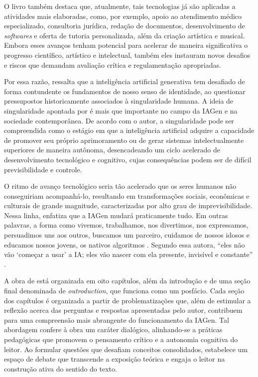 \documentclass[portuguese]{textolivre}
\begin{document}
O livro também destaca que, atualmente, tais tecnologias já são aplicadas a atividades mais elaboradas, como, por exemplo, apoio ao atendimento médico especializado, consultoria jurídica, redação de documentos, desenvolvimento de \textit{softwares} e oferta de tutoria personalizada, além da criação artística e musical. Embora esses avanços tenham potencial para acelerar de maneira significativa o progresso científico, artístico e intelectual, também eles instauram novos desafios e riscos que demandam avaliação crítica e regulamentação apropriadas.

Por essa razão, \textcite{kaplan2024generative} ressalta que a inteligência artificial generativa tem desafiado de forma contundente os fundamentos de nosso senso de identidade, ao questionar pressupostos historicamente associados à singularidade humana. A ideia de singularidade apontada por \textcite{kaplan2024generative} é mais que importante no campo da IAGen e na sociedade contemporânea. De acordo com o autor, a singularidade pode ser compreendida como o estágio em que a inteligência artificial adquire a capacidade de promover seu próprio aprimoramento ou de gerar sistemas intelectualmente superiores de maneira autônoma, desencadeando um ciclo acelerado de desenvolvimento tecnológico e cognitivo, cujas consequências podem ser de difícil previsibilidade e controle.

O ritmo de avanço tecnológico seria tão acelerado que os seres humanos não conseguiriam acompanhá-lo, resultando em transformações sociais, econômicas e culturais de grande magnitude, caracterizadas por alto grau de imprevisibilidade. Nessa linha, \textcite{kaplan2024generative} enfatiza que a IAGen mudará praticamente tudo. Em outras palavras, a forma como vivemos, trabalhamos, nos divertimos, nos expressamos, persuadimos uns aos outros, buscamos um parceiro, cuidamos de nossos idosos e educamos nossos jovens, os nativos algoritmos \cite{jorge2025iai}. Segundo essa autora, “eles não vão ‘começar a usar’ a IA; eles vão nascer com ela presente, invisível e constante” \cite[p.~189]{jorge2025iai}.

A obra de \textcite{kaplan2024generative} está organizada em oito capítulos, além da introdução e de uma seção final denominada de \textit{outroduction}, que funciona como um posfácio. Cada seção dos capítulos é organizada a partir de problematizações que, além de estimular a reflexão acerca das perguntas e respostas apresentadas pelo autor, contribuem para uma compreensão mais abrangente do funcionamento da IAGen. Tal abordagem confere à obra um caráter dialógico, alinhando-se a práticas pedagógicas que promovem o pensamento crítico e a autonomia cognitiva do leitor. Ao formular questões que desafiam conceitos consolidados, \textcite{kaplan2024generative} estabelece um espaço de debate que transcende a exposição teórica e engaja o leitor na construção ativa do sentido do texto.
\end{document}
